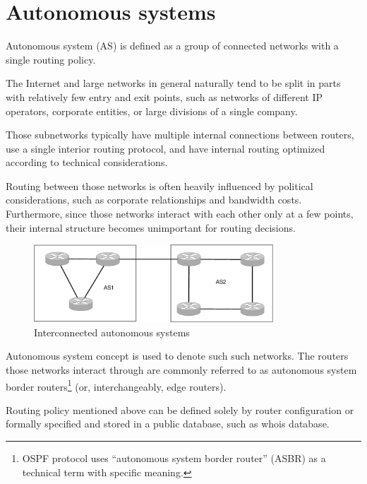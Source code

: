 %

\chapter{Autonomous systems}

Autonomous system (AS) is defined as a group of connected networks with a single routing policy\cite{rfc1930}.

The Internet and large networks in general naturally tend to be split in parts with relatively few
entry and exit points, such as networks of different IP operators, corporate entities, or large divisions
of a single company.

Those subnetworks typically have multiple internal connections between routers, use a single interior
routing protocol, and have internal routing optimized according to technical considerations.

Routing between those networks is often heavily influenced by political considerations, such as
corporate relationships and bandwidth costs. Furthermore, since those networks interact with each other
only at a few points, their internal structure becomes unimportant for routing decisions.

\begin{figure}[h]
    \centering
    \includegraphics[width=0.8\textwidth]{graphics/as_example.eps}
    \caption{Interconnected autonomous systems}
    \label{fig:as_example}
\end{figure}

Autonomous system concept is used to denote such such networks. The routers those networks interact
through are commonly referred to as autonomous system border routers\footnote{OSPF protocol uses
``autonomous system border router'' (ASBR) as a technical term with specific meaning.} (or, interchangeably, edge routers).

Routing policy mentioned above can be defined solely by router configuration or formally specified and stored in 
a public database, such as whois database.


